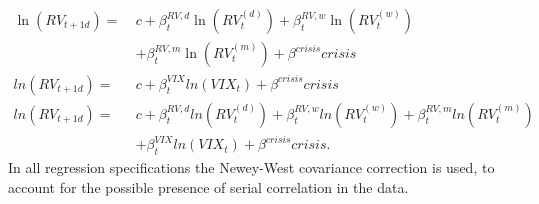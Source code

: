 \begin{align}
\ln(RV_{t+1d}) = \ &c + \beta^{RV,d}_{t} \ln(RV^{(d)}_{t}) + \beta^{RV,w}_{t} \ln(RV^{(w)}_{t}) \nonumber \\
& + \beta^{RV,m}_{t} \ln(RV^{(m)}_{t}) + \beta^{crisis} crisis  \tag{Reg1b}  \label{eq:Reg1b}\\[1em]
ln(RV_{t+1d}) =  \ &c + \beta^{VIX}_{t} ln(VIX_{t}) + \beta^{crisis} crisis  \tag{Reg2b}  \label{eq:Reg2b}\\[1em]
ln(RV_{t+1d}) = \ &c + \beta^{RV,d}_{t} ln(RV^{(d)}_{t}) + \beta^{RV,w}_{t} ln(RV^{(w)}_{t}) + \beta^{RV,m}_{t} ln(RV^{(m)}_{t}) \nonumber \\
& + \beta^{VIX}_{t} ln(VIX_{t})+ \beta^{crisis} crisis.  \tag{Reg3b}  \label{eq:Reg3b}
\end{align}
In all regression specifications the Newey-West covariance correction is used, to account for the possible presence of serial correlation in the data.

